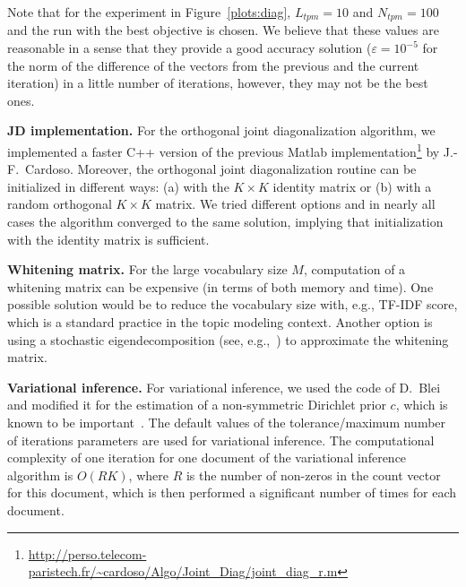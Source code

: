 \documentclass{article}
\begin{document}
Note that for the experiment in Figure~\ref{plots:diag}, $L_{tpm}=10$ and $N_{tpm} = 100$ and the run with the best objective is chosen. We believe that these values are reasonable in a sense that they provide a good accuracy solution ($\varepsilon = 10^{-5}$ for the norm of the difference of the vectors from the previous and the current iteration) in a little number of iterations, however, they may not be the best ones. 

\textbf{JD implementation.} 
For the orthogonal joint diagonalization algorithm, we implemented a faster C++ version of the previous Matlab implementation\footnote{\url{http://perso.telecom-paristech.fr/~cardoso/Algo/Joint_Diag/joint_diag_r.m}} by J.-F.~Cardoso. Moreover, the orthogonal joint diagonalization routine can be initialized in different ways: (a) with the $K\times K$ identity matrix or (b) with a random orthogonal $K\times K$ matrix. We tried different options and in nearly all cases the algorithm converged to the same solution, implying that initialization with the identity matrix is sufficient.


\textbf{Whitening matrix.} For the large vocabulary size $M$,  computation of a whitening matrix can be expensive (in terms of both memory and time).
One possible solution would be to reduce the vocabulary size with, e.g., TF-IDF score, which is a standard practice in the topic modeling context.
Another option is using a stochastic eigendecomposition (see, e.g.,~) to approximate the whitening matrix.

\textbf{Variational inference.} For variational inference, we used the code of D.~Blei and modified it for the estimation of a non-symmetric Dirichlet prior $c$, which is known to be important~. The default values of the tolerance/maximum number of iterations parameters are used for variational inference. The computational complexity of one iteration for one document of the variational inference algorithm is $O(RK)$, where $R$ is the number of non-zeros in the count vector for this document, which is then performed a significant number of times for each document. 
\end{document}
